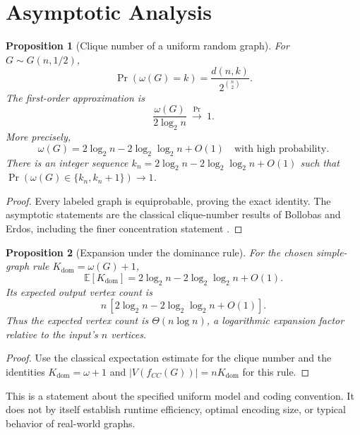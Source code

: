\documentclass[11pt,a4paper]{article}
\newtheorem{proposition}{Proposition}[section]
\theoremstyle{definition}
\newcommand{\Kdom}{K_{\mathrm{dom}}}
\begin{document}
\section{Asymptotic Analysis}
\begin{proposition}[Clique number of a uniform random graph]
For $G\sim G(n,1/2)$,
\[
 \Pr(\omega(G)=k)=\frac{d(n,k)}{2^{\binom n2}}.
\]
The first-order approximation is
\[
 \frac{\omega(G)}{2\log_2n}\ \xrightarrow{\Pr}\ 1.
\]
More precisely,
\[
 \omega(G)=2\log_2n-2\log_2\log_2n+O(1)
 \quad\text{with high probability}.
\]
There is an integer sequence $k_n=2\log_2n-2\log_2\log_2n+O(1)$
such that $\Pr(\omega(G)\in\{k_n,k_n+1\})\to1$.
\end{proposition}
\begin{proof}
Every labeled graph is equiprobable, proving the exact identity.
The asymptotic statements are the classical clique-number results
of Bollobas and Erdos, including the finer concentration statement
\cite{bollobaserdos1976,bollobas2001}.
\end{proof}
\begin{proposition}[Expansion under the dominance rule]
For the chosen simple-graph rule $\Kdom=\omega(G)+1$,
\[
 \mathbb E[\Kdom]=2\log_2n-2\log_2\log_2n+O(1).
\]
Its expected output vertex count is
\[
 n\,[2\log_2n-2\log_2\log_2n+O(1)].
\]
Thus the expected vertex count is $\Theta(n\log n)$, a logarithmic expansion
factor relative to the input's $n$ vertices.
\end{proposition}
\begin{proof}
Use the classical expectation estimate for the clique number
\cite{bollobaserdos1976,bollobas2001} and the identities
$\Kdom=\omega+1$ and $|V(f_{CC}(G))|=n\Kdom$ for this rule.
\end{proof}
This is a statement about the specified uniform model and coding
convention. It does not by itself establish runtime efficiency,
optimal encoding size, or typical behavior of real-world graphs.
\end{document}

